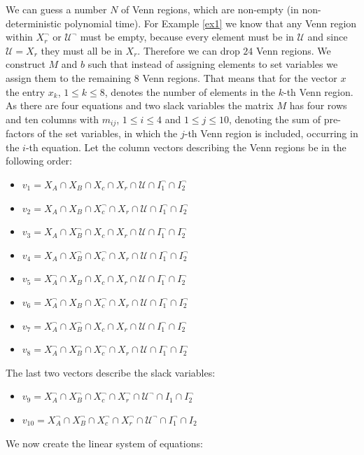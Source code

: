 \documentclass{book}
\theoremstyle{break}
\theoremstyle{definition}
\begin{document}
We can guess a number $N$ of Venn regions, which are non-empty (in non-deterministic polynomial time). For Example \ref{ex1} we know that any Venn region within $X_r^\neg$ or $\mathcal{U}^\neg$ must be empty, because every element must be in $\mathcal{U}$ and since $\mathcal{U}=X_r$ they must all be in $X_r$. Therefore we can drop $24$ Venn regions. We construct $M$ and $b$ such that instead of assigning elements to set variables we assign them to the remaining $8$ Venn regions. That means that for the vector $x$ the entry $x_k$, $1\leq k\leq 8$, denotes the number of elements in the $k$-th Venn region. As there are four equations and two slack variables the matrix $M$ has four rows and ten columns with $m_{ij}$, $1\leq i\leq 4$ and $1\leq j\leq 10$, denoting the sum of pre-factors of the set variables, in which the $j$-th Venn region is included, occurring in the $i$-th equation. Let the column vectors describing the Venn regions be in the following order:
\begin{itemize}
\item $v_1=X_A\cap X_B\cap X_c\cap X_r\cap \mathcal{U}\cap I_1^\neg\cap I_2^\neg$
\item $v_2=X_A\cap X_B\cap X_c^\neg\cap X_r\cap \mathcal{U}\cap I_1^\neg\cap I_2^\neg$
\item $v_3=X_A\cap X_B^\neg\cap X_c\cap X_r\cap \mathcal{U}\cap I_1^\neg\cap I_2^\neg$
\item $v_4=X_A\cap X_B^\neg\cap X_c^\neg \cap X_r\cap \mathcal{U}\cap I_1^\neg\cap I_2^\neg$
\item $v_5=X_A^\neg\cap X_B\cap X_c\cap X_r\cap \mathcal{U}\cap I_1^\neg\cap I_2^\neg$
\item $v_6=X_A^\neg\cap X_B\cap X_c^\neg\cap X_r\cap \mathcal{U}\cap I_1^\neg\cap I_2^\neg$
\item $v_7=X_A^\neg\cap X_B^\neg\cap X_c\cap X_r\cap \mathcal{U}\cap I_1^\neg\cap I_2^\neg$
\item $v_8=X_A^\neg\cap X_B^\neg\cap X_c^\neg\cap X_r\cap \mathcal{U}\cap I_1^\neg\cap I_2^\neg$
\end{itemize}
The last two vectors describe the slack variables:
\begin{itemize}
\item $v_9=X_A^\neg\cap X_B^\neg\cap X_c^\neg\cap X_r^\neg\cap \mathcal{U}^\neg\cap I_1\cap I_2^\neg$
\item $v_{10}=X_A^\neg\cap X_B^\neg\cap X_c^\neg\cap X_r^\neg\cap \mathcal{U}^\neg\cap I_1^\neg\cap I_2$
\end{itemize}
We now create the linear system of equations:
\end{document}
